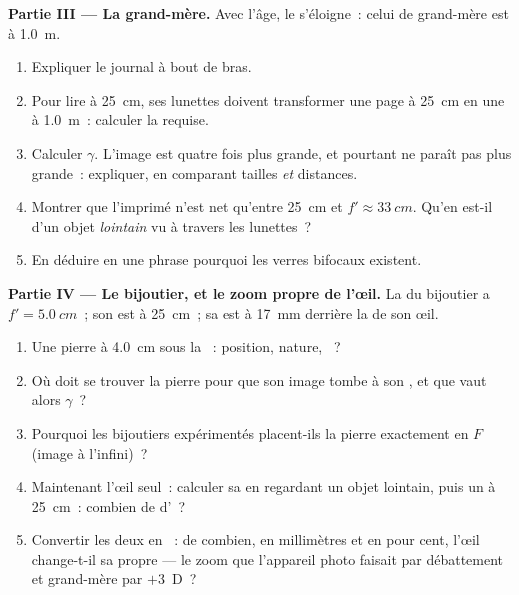 \begin{problem}
\medskip
\noindent\textbf{Partie III --- La grand-mère.}
Avec l'âge, le  s'éloigne~: celui de
grand-mère est à \qty{1.0}{m}.
\begin{enumerate}[resume]
  \item Expliquer le journal à bout de bras.
  \item Pour lire à \qty{25}{cm}, ses lunettes doivent transformer une
        page à \qty{25}{cm} en une 
        à \qty{1.0}{m}~: calculer la
         requise.
  \item Calculer $\gamma$. L'image est quatre fois plus grande, et
        pourtant ne paraît pas plus grande~: expliquer, en comparant
        tailles \emph{et} distances.
  \item Montrer que l'imprimé n'est net qu'entre \qty{25}{cm} et
        $f' \approx \qty{33}{cm}$. Qu'en est-il d'un objet
        \emph{lointain} vu à travers les lunettes~?
  \item En déduire en une phrase pourquoi les verres bifocaux existent.
\end{enumerate}

\medskip
\noindent\textbf{Partie IV --- Le bijoutier, et le zoom propre de l'œil.}
La  du bijoutier a $f' = \qty{5.0}{cm}$~; son
 est à \qty{25}{cm}~; sa
 est à \qty{17}{mm} derrière la
 de son œil.
\begin{enumerate}[resume]
  \item Une pierre à \qty{4.0}{cm} sous la ~: position, nature,
        ~?
  \item Où doit se trouver la pierre pour que son image tombe à son
        , et que vaut alors $\gamma$~?
  \item Pourquoi les bijoutiers expérimentés placent-ils la pierre
        exactement en $F$ (image à l'infini)~?
  \item Maintenant l'œil seul~: calculer sa
         en regardant un objet lointain,
        puis un à \qty{25}{cm}~: combien de
        d'~?
  \item Convertir les deux  en
        ~: de combien, en
        millimètres et en pour cent, l'œil change-t-il sa propre
         --- le zoom que l'appareil
        photo faisait par débattement et grand-mère par $+3$~D~?
\end{enumerate}
\end{problem}
